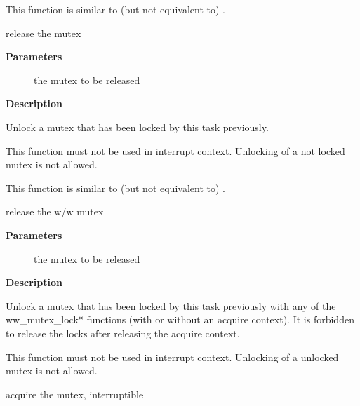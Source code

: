 \documentclass[a4paper,8pt,english]{sphinxmanual}
\begin{document}
This function is similar to (but not equivalent to) .

\begin{fulllineitems}
\label{kernel-hacking/locking:c.mutex_unlock}
release the mutex

\end{fulllineitems}


\textbf{Parameters}
\begin{description}
\item[{}] \leavevmode
the mutex to be released

\end{description}

\textbf{Description}

Unlock a mutex that has been locked by this task previously.

This function must not be used in interrupt context. Unlocking
of a not locked mutex is not allowed.

This function is similar to (but not equivalent to) .

\begin{fulllineitems}
\label{kernel-hacking/locking:c.ww_mutex_unlock}
release the w/w mutex

\end{fulllineitems}


\textbf{Parameters}
\begin{description}
\item[{}] \leavevmode
the mutex to be released

\end{description}

\textbf{Description}

Unlock a mutex that has been locked by this task previously with any of the
ww\_mutex\_lock* functions (with or without an acquire context). It is
forbidden to release the locks after releasing the acquire context.

This function must not be used in interrupt context. Unlocking
of a unlocked mutex is not allowed.

\begin{fulllineitems}
\label{kernel-hacking/locking:c.mutex_lock_interruptible}
acquire the mutex, interruptible

\end{fulllineitems}
\end{document}
